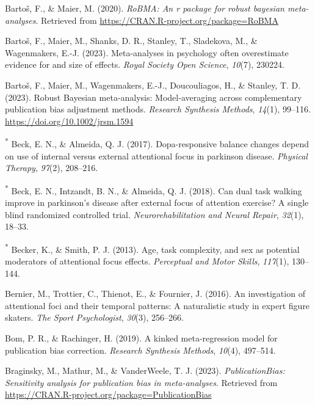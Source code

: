 \documentclass[
  man, donotrepeattitle,floatsintext]{apa7}
\newlength{\cslhangindent}
\newlength{\cslentryspacingunit} %
\newenvironment{CSLReferences}[2] %
 {%
  \setlength{\parindent}{0pt}
  \ifodd #1
  \let\oldpar\par
  \def\par{\hangindent=\cslhangindent\oldpar}
  \fi
  \setlength{\parskip}{#2\cslentryspacingunit}
 }%
 {}
\begin{document}
\begin{CSLReferences}{1}{0}
\leavevmode{}%
Bartoš, F., \& Maier, M. (2020). \emph{RoBMA: An r package for robust bayesian meta-analyses}. Retrieved from \url{https://CRAN.R-project.org/package=RoBMA}

\leavevmode{}%
Bartoš, F., Maier, M., Shanks, D. R., Stanley, T., Sladekova, M., \& Wagenmakers, E.-J. (2023). Meta-analyses in psychology often overestimate evidence for and size of effects. \emph{Royal Society Open Science}, \emph{10}(7), 230224.

\leavevmode{}%
Bartoš, F., Maier, M., Wagenmakers, E.-J., Doucouliagos, H., \& Stanley, T. D. (2023). Robust {Bayesian} meta-analysis: {Model-averaging} across complementary publication bias adjustment methods. \emph{Research Synthesis Methods}, \emph{14}(1), 99--116. \url{https://doi.org/10.1002/jrsm.1594}

\leavevmode{}%
\textsuperscript{*} Beck, E. N., \& Almeida, Q. J. (2017). Dopa-responsive balance changes depend on use of internal versus external attentional focus in parkinson disease. \emph{Physical Therapy}, \emph{97}(2), 208--216.

\leavevmode{}%
\textsuperscript{*} Beck, E. N., Intzandt, B. N., \& Almeida, Q. J. (2018). Can dual task walking improve in parkinson's disease after external focus of attention exercise? A single blind randomized controlled trial. \emph{Neurorehabilitation and Neural Repair}, \emph{32}(1), 18--33.

\leavevmode{}%
\textsuperscript{*} Becker, K., \& Smith, P. J. (2013). Age, task complexity, and sex as potential moderators of attentional focus effects. \emph{Perceptual and Motor Skills}, \emph{117}(1), 130--144.

\leavevmode{}%
Bernier, M., Trottier, C., Thienot, E., \& Fournier, J. (2016). An investigation of attentional foci and their temporal patterns: A naturalistic study in expert figure skaters. \emph{The Sport Psychologist}, \emph{30}(3), 256--266.

\leavevmode{}%
Bom, P. R., \& Rachinger, H. (2019). A kinked meta-regression model for publication bias correction. \emph{Research Synthesis Methods}, \emph{10}(4), 497--514.

\leavevmode{}%
Braginsky, M., Mathur, M., \& VanderWeele, T. J. (2023). \emph{PublicationBias: Sensitivity analysis for publication bias in meta-analyses}. Retrieved from \url{https://CRAN.R-project.org/package=PublicationBias}


\end{CSLReferences}
\end{document}
